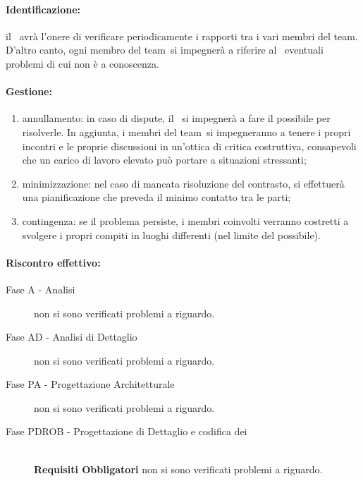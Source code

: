 \documentclass[../PianoProgetto.tex]{subfiles}
\begin{document}
	\paragraph*{Identificazione:} il \responsabilediprogetto\ avrà l'onere di verificare periodicamente i rapporti tra i vari membri del team\g. D'altro canto, ogni membro del team\g\ si impegnerà a riferire al \responsabilediprogetto\ eventuali problemi di cui non è a conoscenza.
	
	\paragraph*{Gestione:}
	\begin{enumerate}
		\item annullamento: in caso di dispute, il \responsabilediprogetto\ si impegnerà a fare il possibile per risolverle. In aggiunta, i membri del team\g\ si impegneranno a tenere i propri incontri e le proprie discussioni in un'ottica di critica costruttiva, consapevoli che un carico di lavoro elevato può portare a situazioni stressanti;
		\item minimizzazione: nel caso di mancata risoluzione del contrasto, si effettuerà una pianificazione che preveda il minimo contatto tra le parti; 
		\item contingenza: se il problema persiste, i membri coinvolti verranno costretti a svolgere i propri compiti in luoghi differenti (nel limite del possibile).
	\end{enumerate}	
	
	
	\paragraph*{Riscontro effettivo:}
		\begin{description}
			\item[Fase A - Analisi] non si sono verificati problemi a riguardo.
			\item[Fase AD - Analisi di Dettaglio] non si sono verificati problemi a riguardo.
			\item[Fase PA - Progettazione Architetturale] non si sono verificati problemi a riguardo.
			\item[Fase PDROB - Progettazione di Dettaglio e codifica dei]  \ \\
					\textbf{Requisiti Obbligatori} non si sono verificati problemi a riguardo.
		\end{description}
\end{document}
